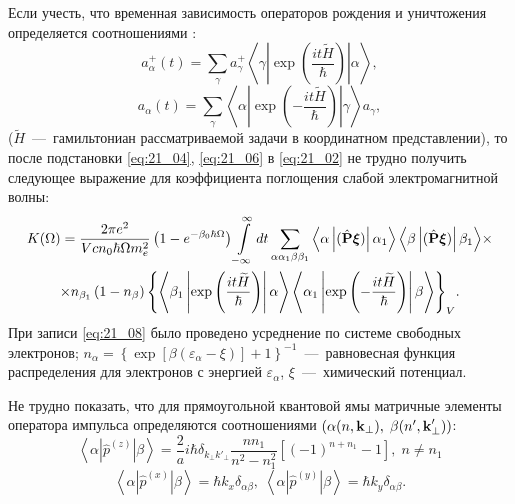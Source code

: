 Если учесть, что временная зависимость операторов рождения и уничтожения определяется соотношениями \cite{Khamidullin2002}:
\begin{equation} \label{eq:21_04}
a_{\alpha}^+ (t) = \sum_{\gamma}{a_{\gamma}^+ \left\langle \gamma \left| \exp{\left( \frac{it\widetilde{H}}{\hbar}\right) } \right| \alpha \right\rangle},
\end{equation}
\begin{equation} \label{eq:21_06}
a_{\alpha} (t) = \sum_{\gamma}{\left\langle \alpha \left| \exp{\left(- \frac{it\widetilde{H}}{\hbar}\right) } \right| \gamma \right\rangle a_{\gamma}},
\end{equation}  
($\widetilde{H}$~---~гамильтониан рассматриваемой задачи в координатном представлении), то после подстановки \eqref{eq:21_04}, \eqref{eq:21_06} в \eqref{eq:21_02} не трудно получить следующее выражение для коэффициента поглощения слабой электромагнитной волны: 
\begin{multline} \label{eq:21_08}
K(\Omega) = \frac{2 \pi e^2 }{V c n_0 \hbar \Omega m_e^2}\left( 1 - e^{-\beta_0 \hbar \Omega} \right) \int\limits_{-\infty }^{\infty} {dt \sum_{\alpha \alpha_1 \beta \beta_1} {\left\langle \alpha \left| (\hat{\boldsymbol{\mathbf{P}}} \boldsymbol{\mathbf{\xi}})  \right| \alpha_1 \right\rangle \left\langle \beta \left| (\hat{\boldsymbol{\mathbf{P}}} \boldsymbol{\mathbf{\xi}})  \right| \beta_1 \right\rangle}} \times\\
\times n_{\beta_1} \left(1-n_{\beta} \right)
{\left\lbrace  \left\langle \beta_1 \left| \exp \left(\frac{it\widetilde{H}}{\hbar}\right) \right|\alpha\right\rangle \left\langle \alpha_1 \left| \exp \left(-\frac{it\widetilde{H}}{\hbar}\right) \right|\beta\right\rangle \right\rbrace }_V  .
\end{multline} 
При записи \eqref{eq:21_08} было проведено усреднение по системе свободных электронов; $n_\alpha = \left\{ \exp\left[ \beta \left( \varepsilon _\alpha - \xi \right) \right] + 1 \right\}^{- 1}$~---~равновесная
функция распределения для электронов с энергией $\varepsilon{_\alpha}$, $\xi $~---~химический потенциал.

Не трудно показать, что для прямоугольной квантовой ямы матричные элементы оператора импульса определяются соотношениями $(\alpha (n, \boldsymbol{\mathbf{k}}{_\bot}), \; \beta (n', \boldsymbol{\mathbf{k}}'_{\bot}))$:
\begin{equation} \label{eq:21_09_01}
\left\langle \alpha \left| \hat{p}^{(z)} \right| \beta \right\rangle = \frac{2}{a} i\hbar \delta_{k_\bot k'_\bot} \frac{n n_1}{n^2 - n_1^2} \left[(-1)^{n+n_1} -1 \right] , \; n \neq n_1
\end{equation}
\begin{equation} \label{eq:21_09_02}
\left\langle \alpha \left| \hat{p}^{(x)} \right| \beta \right\rangle = \hbar k_x \delta_{\alpha\beta},\;
\left\langle \alpha \left| \hat{p}^{(y)} \right| \beta \right\rangle = \hbar k_y \delta_{\alpha\beta}.
\end{equation} 

